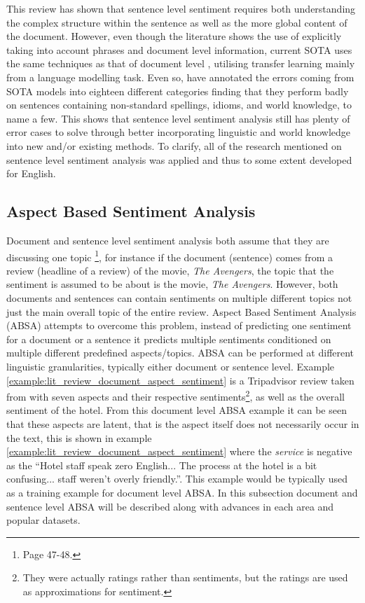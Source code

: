 This review has shown that sentence level sentiment requires both understanding the complex structure within the sentence as well as the more global content of the document. However, even though the literature shows the use of explicitly taking into account phrases and document level information, current SOTA uses the same techniques as that of document level \citep{yang2019xlnet}, utilising transfer learning mainly from a language modelling task. Even so, \citet{barnes-etal-2019-sentiment} have annotated the errors coming from SOTA models into eighteen different categories finding that they perform badly on sentences containing non-standard spellings, idioms, and world knowledge, to name a few. This shows that sentence level sentiment analysis still has plenty of error cases to solve through better incorporating linguistic and world knowledge into new and/or existing methods. To clarify, all of the research mentioned on sentence level sentiment analysis was applied and thus to some extent developed for English. 

\subsection{Aspect Based Sentiment Analysis}
Document and sentence level sentiment analysis both assume that they are discussing one topic \citep{liu2015sentiment}\footnote{Page 47-48.}, for instance if the document (sentence) comes from a review (headline of a review) of the movie, \textit{The Avengers}, the topic that the sentiment is assumed to be about is the movie, \textit{The Avengers}. However, both documents and sentences can contain sentiments on multiple different topics not just the main overall topic of the entire review. Aspect Based Sentiment Analysis (ABSA) attempts to overcome this problem, instead of predicting one sentiment for a document or a sentence it predicts multiple sentiments conditioned on multiple different predefined aspects/topics. ABSA can be performed at different linguistic granularities, typically either document or sentence level. Example \ref{example:lit_review_document_aspect_sentiment} is a Tripadvisor review taken from \citet{Wang2010LatentAR} with seven aspects and their respective sentiments\footnote{They were actually ratings rather than sentiments, but the ratings are used as approximations for sentiment.}, as well as the overall sentiment of the hotel. From this document level ABSA example it can be seen that these aspects are latent, that is the aspect itself does not necessarily occur in the text, this is shown in example \ref{example:lit_review_document_aspect_sentiment} where the \textit{service} is negative as the ``Hotel staff speak zero English... The process at the hotel is a bit confusing... staff weren't overly friendly.''. This example would be typically used as a training example for document level ABSA. In this subsection document and sentence level ABSA will be described along with advances in each area and popular datasets.


